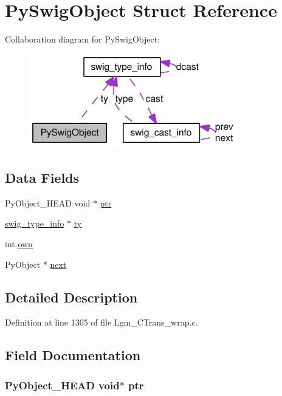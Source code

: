 \hypertarget{struct_py_swig_object}{
\section{PySwigObject Struct Reference}
\label{struct_py_swig_object}
}
Collaboration diagram for PySwigObject:\nopagebreak
\begin{figure}[H]
\begin{center}
\leavevmode
\includegraphics[width=257pt]{struct_py_swig_object__coll__graph}
\end{center}
\end{figure}
\subsection*{Data Fields}
\begin{CompactItemize}
\item 
PyObject\_\-HEAD void $\ast$ \hyperlink{struct_py_swig_object_43cee60913250bcaf1ed538ea443a0a7}{ptr}
\item 
\hyperlink{structswig__type__info}{swig\_\-type\_\-info} $\ast$ \hyperlink{struct_py_swig_object_6b6270e5da3083fb1e9476b22a0611ad}{ty}
\item 
int \hyperlink{struct_py_swig_object_4047a08438f6fec73854d5e936100de0}{own}
\item 
PyObject $\ast$ \hyperlink{struct_py_swig_object_6ff221eaf6fa7553a0d69c6caad8c815}{next}
\end{CompactItemize}


\subsection{Detailed Description}


Definition at line 1305 of file Lgm\_\-CTrans\_\-wrap.c.

\subsection{Field Documentation}
\hypertarget{struct_py_swig_object_43cee60913250bcaf1ed538ea443a0a7}{
\subsubsection[{ptr}]{\setlength{\rightskip}{0pt plus 5cm}PyObject\_\-HEAD void$\ast$ {\bf ptr}}}
\label{struct_py_swig_object_43cee60913250bcaf1ed538ea443a0a7}




